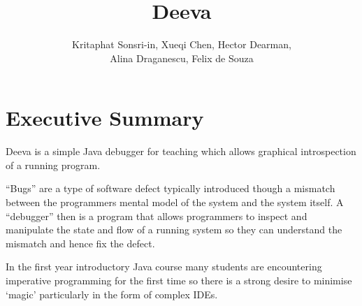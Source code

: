 \documentclass[11pt, a4paper]{article}
\newcommand{\subtitle}[1]{
  \posttitle{
    \par\end{center}
    \begin{center}\large#1\end{center}
    \vskip0.5em}
}
\begin{document}
\title{Deeva}
\subtitle{Final Report}
\author{Kritaphat Sonsri-in, Xueqi Chen, Hector Dearman, \\Alina Draganescu, Felix de Souza}

\maketitle






\section*{Executive Summary}
Deeva is a simple Java debugger for teaching which allows graphical introspection of a running program.

``Bugs'' are a type of software defect typically introduced though a mismatch between the programmers mental model of the system and the system itself.
A ``debugger'' then is a program that allows programmers to inspect and manipulate the state and flow of a running system so they can understand the mismatch and hence fix the defect.

In the first year introductory Java course many students are encountering imperative programming for the first time so there is a strong desire  to minimise `magic' particularly in the form of complex IDEs.
\end{document}
